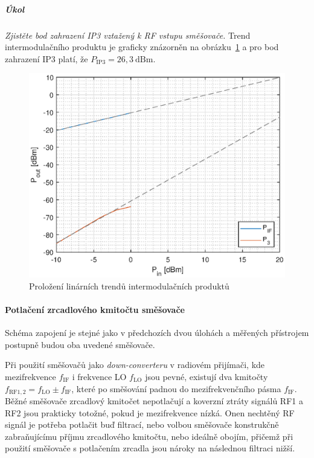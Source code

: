 \documentclass[11pt,a4paper]{article}
\begin{document}
\subparagraph*{Úkol} \emph{Zjistěte bod zahrazení IP3 vztažený k RF vstupu směšovače.} Trend intermodulačního produktu je graficky znázorněn na obrázku~\ref{fig:task2-ip3} a pro bod zahrazení IP3 platí, že $P_{\mathrm{IP3}} = 26,3~\mathrm{dBm}$.
\begin{figure}[!ht]
    \centering
    \includegraphics[width=.6\textwidth]{src/task2-ip3.eps}
    \caption{Proložení linárních trendů intermodulačních produktů}
    \label{fig:task2-ip3}
\end{figure}

\paragraph*{Potlačení zrcadlového kmitočtu směšovače} Schéma zapojení je stejné jako v předchozích dvou úlohách a měřených přístrojem postupně budou oba uvedené směšovače.

Při použití směšovačů jako \emph{down-converteru} v radiovém přijímači, kde mezifrekvence $f_{\mathrm{IF}}$ i frekvence LO $f_{\mathrm{LO}}$ jsou pevné, existují dva kmitočty $f_{\mathrm{RF1,2}} = f_{\mathrm{LO}}\pm f_{\mathrm{IF}}$, které po směšování padnou do mezifrekvenčního pásma $f_{\mathrm{IF}}$. Běžné směšovače zrcadlový kmitočet nepotlačují a koverzní ztráty signálů RF1 a RF2 jsou prakticky totožné, pokud je mezifrekvence nízká. Onen nechtěný RF signál je potřeba potlačit buď filtrací, nebo volbou směšovače konstrukčně zabraňujícímu příjmu zrcadlového kmitočtu, nebo ideálně obojím, přičemž při použití směšovače s potlačením zrcadla jsou nároky na následnou filtraci nižší.
\end{document}
